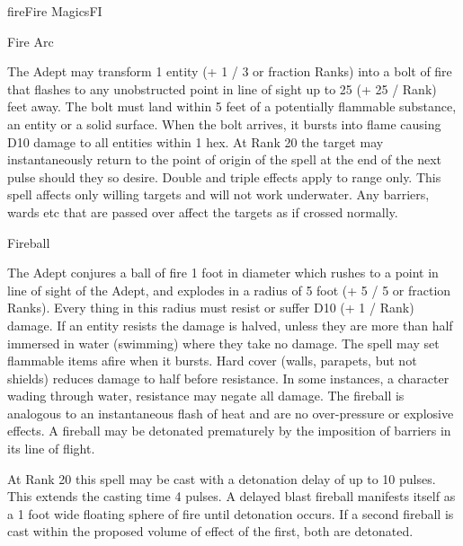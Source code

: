 \begin{college}[2.0]{fire}{Fire Magics}{FI}
\begin{spell}[S-3]{Fire Arc}
\begin{effects}
The Adept may transform 1 entity (+ 1 / 3 or fraction Ranks) into a
bolt of fire that flashes to any unobstructed point in line of sight
up to 25 (+ 25 / Rank) feet away. The bolt must land within 5 feet of
a potentially flammable substance, an entity or a solid surface. When
the bolt arrives, it bursts into flame causing D10 damage to all
entities within 1 hex. At Rank 20 the target may instantaneously
return to the point of origin of the spell at the end of the next
pulse should they so desire. Double and triple effects apply to range
only. This spell affects only willing targets and will not work
underwater. Any barriers, wards etc that are passed over affect the
targets as if crossed normally.
\end{effects}
\end{spell}

\begin{spell}[S-4]{Fireball}
\begin{effects}
The Adept conjures a ball of fire 1 foot in diameter which rushes to a
point in line of sight of the Adept, and explodes in a radius of 5
foot (+ 5 / 5 or fraction Ranks). Every thing in this radius must
resist or suffer D10 (+ 1 / Rank) damage. If an entity resists the
damage is halved, unless they are more than half immersed in water
(\eg swimming) where they take no damage. The spell may set flammable
items afire when it bursts. Hard cover (\eg walls, parapets, but not
shields) reduces damage to half before resistance. In some instances,
\eg a character wading through water, resistance may negate all
damage. The fireball is analogous to an instantaneous flash of heat
and are no over-pressure or explosive effects. A fireball may be
detonated prematurely by the imposition of barriers in its line of
flight.

At Rank 20 this spell may be cast with a detonation delay of up to 10
pulses. This extends the casting time 4 pulses. A delayed blast
fireball manifests itself as a 1 foot wide floating sphere of fire
until detonation occurs. If a second fireball is cast within the
proposed volume of effect of the first, both are detonated.
\end{effects}
\end{spell}


\end{college}
